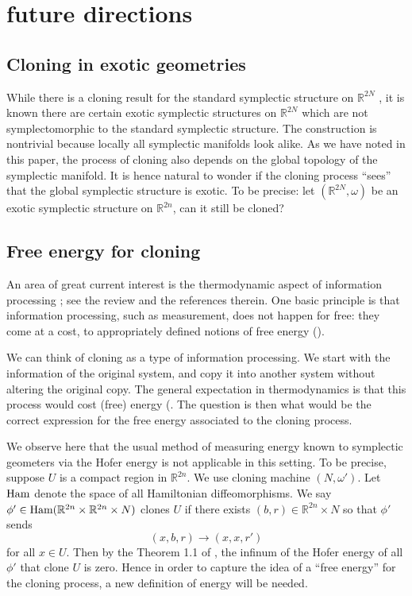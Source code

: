 \documentclass[jmp,amsmath,amssymb]{revtex4-1}
\theoremstyle{plain}
\begin{document}
\section{future directions}\label{sec:future directions}

\subsection{Cloning in exotic geometries}
While there is a cloning result for the standard symplectic structure on $\mathbb{R}^{2N}$ \cite{fenyes}, it is known there are certain exotic symplectic structures on $\mathbb{R}^{2N}$ \cite{exotic_symplectic} which are not symplectomorphic to the standard symplectic structure. The construction is nontrivial because locally all symplectic manifolds look alike. As we have noted in this paper, the process of cloning also depends on the global topology of the symplectic manifold. It is hence natural to wonder if the cloning process ``sees'' that the global symplectic structure is exotic. To be precise:
let $(\mathbb{R}^{2N}, \omega)$ be an exotic symplectic structure on $\mathbb{R}^{2n}$, can it still be cloned?

\subsection{Free energy for cloning}

An area of great current interest is the thermodynamic aspect of information processing \cite{information_thermo,landauer,thermodynamics_of_feedback_controlled_systems}; see the review \cite{information_thermo} and the references therein. One basic principle is that information processing, such as measurement, does not happen for free: they come at a cost, to appropriately defined notions of free energy (\cite{information_thermo}).



We can think of cloning as a type of information processing. We start with the information of the original system, and copy it into another system without altering the original copy. The general expectation in thermodynamics is that this process would cost (free) energy (\cite{information_thermo}. The question is then what would be the correct expression for the free energy associated to the cloning process. 

We observe here that the usual method of measuring energy known to symplectic geometers via the Hofer energy \cite{hofer_1990} is not applicable in this setting. To be precise, suppose $U$ is a compact region in $\mathbb{R}^{2n}$. We use cloning machine $(N,\omega')$. Let $\textup{Ham}$ denote the space of all Hamiltonian diffeomorphisms. We say $\phi' \in \textup{Ham}(\mathbb{R}^{2n}\times \mathbb{R}^{2n} \times N)$ clones $U$ if there exists $(b,r) \in \mathbb{R}^{2n}\times N$
    so that $\phi'$ sends
    \[
    (x,b,r) \rightarrow (x,x,r')
    \]
    for all $x\in U$. 
Then by the Theorem 1.1 of \cite{Usher}, the infinum of the Hofer energy of all $\phi'$ that clone $U$ is zero. Hence in order to capture the idea of a ``free energy'' for the cloning process, a new definition of energy will be needed.
\end{document}
